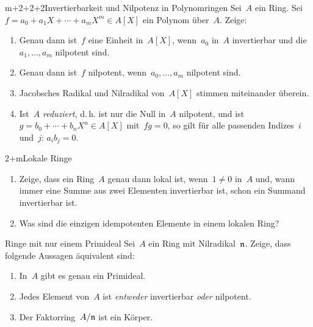 \documentclass{uebblatt}
\begin{document}

\begin{aufgabe}{m+2+2+2}{Invertierbarkeit und Nilpotenz in Polynomringen}
Sei~$A$ ein Ring. Sei~$f = a_0 + a_1 X + \cdots + a_m X^m \in A[X]$ ein Polynom
über~$A$. Zeige:
\begin{enumerate}
\item Genau dann ist~$f$ eine Einheit in~$A[X]$, wenn~$a_0$ in~$A$ invertierbar
und die~$a_1,\ldots,a_m$ nilpotent sind.
\item Genau dann ist~$f$ nilpotent, wenn~$a_0,\ldots,a_m$ nilpotent sind.
\item Jacobsches Radikal und Nilradikal von~$A[X]$ stimmen miteinander überein.
\item Ist~$A$ \emph{reduziert}, d.\,h. ist nur die Null in~$A$ nilpotent,
und ist~$g = b_0 + \cdots + b_n X^n \in A[X]$ mit~$fg = 0$, so gilt für alle passenden Indizes~$i$ und~$j$: $a_i b_j = 0$.
\end{enumerate}
\end{aufgabe}

\begin{aufgabe}{2+m}{Lokale Ringe}
\begin{enumerate}
\item Zeige, dass ein Ring~$A$ genau dann lokal ist,
wenn~$1 \neq 0$ in~$A$ und, wann immer eine Summe aus zwei Elementen
invertierbar ist, schon ein Summand invertierbar ist.
\item Was sind die einzigen idempotenten Elemente in einem lokalen Ring?
\end{enumerate}
\end{aufgabe}

\begin{aufgabe}{4}{Ringe mit nur einem Primideal}
Sei~$A$ ein Ring mit Nilradikal~$\mathfrak{n}$. Zeige, dass folgende
Aussagen äquivalent sind:
\begin{enumerate}
\item[1.] In~$A$ gibt es genau ein Primideal.
\item[2.] Jedes Element von~$A$ ist \emph{entweder} invertierbar \emph{oder}
nilpotent.
\item[3.] Der Faktorring~$A/\mathfrak{n}$ ist ein Körper.
\end{enumerate}
\end{aufgabe}
\end{document}
